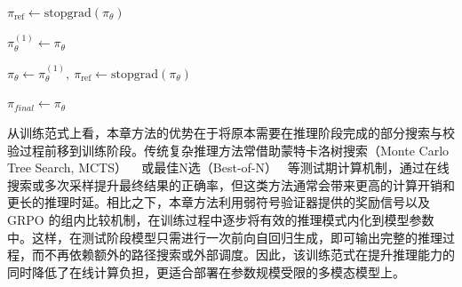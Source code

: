 \begin{algorithm2e}[H]
  \renewcommand{\algorithmcfname}{算法}
  \SetAlCapNameFnt{\small}
  \SetAlCapFnt{\small}

  \small
  \SetAlgoLined



  $\pi_{\mathrm{ref}} \leftarrow \mathrm{stopgrad}(\pi_{\theta})$ 

  $\pi_{\theta}^{(1)} \leftarrow \pi_{\theta}$\;

  $\pi_{\theta} \leftarrow \pi_{\theta}^{(1)},\ \pi_{\mathrm{ref}} \leftarrow \mathrm{stopgrad}(\pi_{\theta})$ 

  $\pi_{final} \leftarrow \pi_{\theta}$\;

  \caption{GeoTSR 两阶段长链条推理增强算法}
  \label{alg:two_stage}
\end{algorithm2e}

从训练范式上看，本章方法的优势在于将原本需要在推理阶段完成的部分搜索与校验过程前移到训练阶段。传统复杂推理方法常借助蒙特卡洛树搜索（Monte Carlo Tree Search, MCTS） ~\cite{coulom2006mcts} 或最佳N选（Best-of-N）~\cite{stiennon2006bestofn} 等测试期计算机制，通过在线搜索或多次采样提升最终结果的正确率，但这类方法通常会带来更高的计算开销和更长的推理时延。相比之下，本章方法利用弱符号验证器提供的奖励信号以及 GRPO 的组内比较机制，在训练过程中逐步将有效的推理模式内化到模型参数中。这样，在测试阶段模型只需进行一次前向自回归生成，即可输出完整的推理过程，而不再依赖额外的路径搜索或外部调度。因此，该训练范式在提升推理能力的同时降低了在线计算负担，更适合部署在参数规模受限的多模态模型上。

